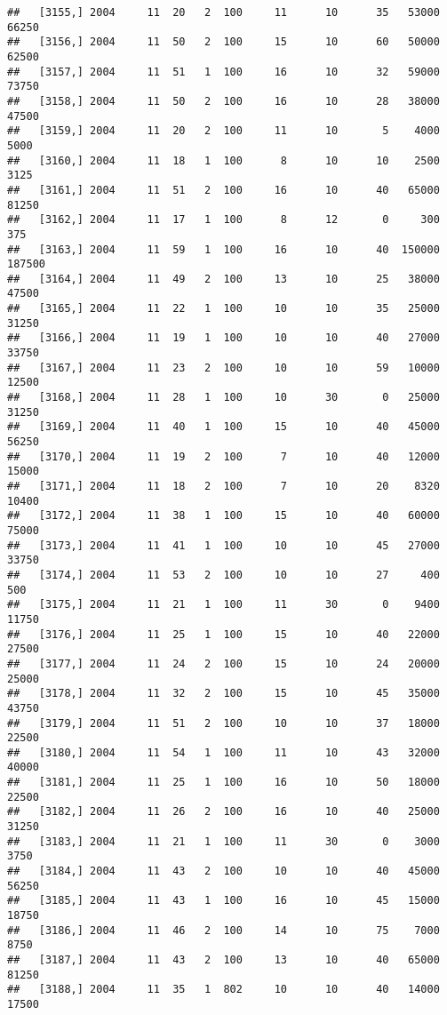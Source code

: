 \documentclass{article}\usepackage[]{graphicx}\usepackage[]{color}
\makeatletter
\newenvironment{kframe}{%
 \def\at@end@of@kframe{}%
 \ifinner\ifhmode%
  \def\at@end@of@kframe{\end{minipage}}%
  \begin{minipage}{\columnwidth}%
 \fi\fi%
 \def\FrameCommand##1{\hskip\@totalleftmargin \hskip-\fboxsep
 \colorbox{shadecolor}{##1}\hskip-\fboxsep
     \hskip-\linewidth \hskip-\@totalleftmargin \hskip\columnwidth}%
 \MakeFramed {\advance\hsize-\width
   \@totalleftmargin\z@ \linewidth\hsize
   \@setminipage}}%
 {\par\unskip\endMakeFramed%
 \at@end@of@kframe}
\newenvironment{knitrout}{}{} %
\makeatother
\begin{document}
\begin{knitrout}
\begin{kframe}
\begin{verbatim}
##   [3155,] 2004     11  20   2  100     11      10      35   53000   66250
##   [3156,] 2004     11  50   2  100     15      10      60   50000   62500
##   [3157,] 2004     11  51   1  100     16      10      32   59000   73750
##   [3158,] 2004     11  50   2  100     16      10      28   38000   47500
##   [3159,] 2004     11  20   2  100     11      10       5    4000    5000
##   [3160,] 2004     11  18   1  100      8      10      10    2500    3125
##   [3161,] 2004     11  51   2  100     16      10      40   65000   81250
##   [3162,] 2004     11  17   1  100      8      12       0     300     375
##   [3163,] 2004     11  59   1  100     16      10      40  150000  187500
##   [3164,] 2004     11  49   2  100     13      10      25   38000   47500
##   [3165,] 2004     11  22   1  100     10      10      35   25000   31250
##   [3166,] 2004     11  19   1  100     10      10      40   27000   33750
##   [3167,] 2004     11  23   2  100     10      10      59   10000   12500
##   [3168,] 2004     11  28   1  100     10      30       0   25000   31250
##   [3169,] 2004     11  40   1  100     15      10      40   45000   56250
##   [3170,] 2004     11  19   2  100      7      10      40   12000   15000
##   [3171,] 2004     11  18   2  100      7      10      20    8320   10400
##   [3172,] 2004     11  38   1  100     15      10      40   60000   75000
##   [3173,] 2004     11  41   1  100     10      10      45   27000   33750
##   [3174,] 2004     11  53   2  100     10      10      27     400     500
##   [3175,] 2004     11  21   1  100     11      30       0    9400   11750
##   [3176,] 2004     11  25   1  100     15      10      40   22000   27500
##   [3177,] 2004     11  24   2  100     15      10      24   20000   25000
##   [3178,] 2004     11  32   2  100     15      10      45   35000   43750
##   [3179,] 2004     11  51   2  100     10      10      37   18000   22500
##   [3180,] 2004     11  54   1  100     11      10      43   32000   40000
##   [3181,] 2004     11  25   1  100     16      10      50   18000   22500
##   [3182,] 2004     11  26   2  100     16      10      40   25000   31250
##   [3183,] 2004     11  21   1  100     11      30       0    3000    3750
##   [3184,] 2004     11  43   2  100     10      10      40   45000   56250
##   [3185,] 2004     11  43   1  100     16      10      45   15000   18750
##   [3186,] 2004     11  46   2  100     14      10      75    7000    8750
##   [3187,] 2004     11  43   2  100     13      10      40   65000   81250
##   [3188,] 2004     11  35   1  802     10      10      40   14000   17500

\end{verbatim}
\end{kframe}
\end{knitrout}
\end{document}
